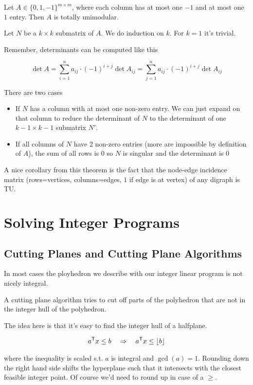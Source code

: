 \begin{thm} Let $A\in \{0,1,-1\}^{m\times m}$, where each column has at most one $-1$ and at most one $1$ entry. Then $A$ is totally unimodular.
\end{thm}

\begin{pr} Let $N$ be a $k\times k$ submatrix of $A$. We do induction on $k$. For $k=1$ it's trivial.

Remember, determinants can be computed like this

\[\det A = \sum_{i=1}^n a_{ij} \cdot (-1)^{i+j} \det A_{ij} = \sum_{j=1}^n a_{ij} \cdot (-1)^{i+j} \det A_{ij}\]

There are two cases

\begin{itemize}
\item If $N$ has a column with at most one non-zero entry. We can just expand on that column to reduce the determinant of $N$ to the determinant of one $k-1\times k-1$ submatrix $N'$.

\item If all columns of $N$ have 2 non-zero entries (more are impossible by definition of $A$), the sum of all rows is $0$ so $N$ is singular and the determinant is $0$
\end{itemize}
\end{pr}

A nice corollary from this theorem is the fact that the node-edge incidence matrix (rows=vertices, columns=edges, $1$ if edge is at vertex) of any digraph is TU.

\chapter{Solving Integer Programs}
\section{Cutting Planes and Cutting Plane Algorithms}
In most cases the ployhedron we describe with our integer linear program is not nicely integral.

A cutting plane algorithm tries to cut off parts of the polyhedron that are not in the integer hull of the polyhedron.

The idea here is that it's easy to find the integer hull of a halfplane. 

\[{a}^\text{\upshape \sffamily T} x \leq b \quad \Rightarrow \quad {a}^\text{\upshape \sffamily T} x \leq \lfloor b \rfloor\]

where the inequality is scaled s.t. $a$ is integral and $\gcd(a)=1$. Rounding down the right hand side shifts the hyperplane such that it intersects with the closest feasible integer point. Of course we'd need to round up in case of a $\geq$.

